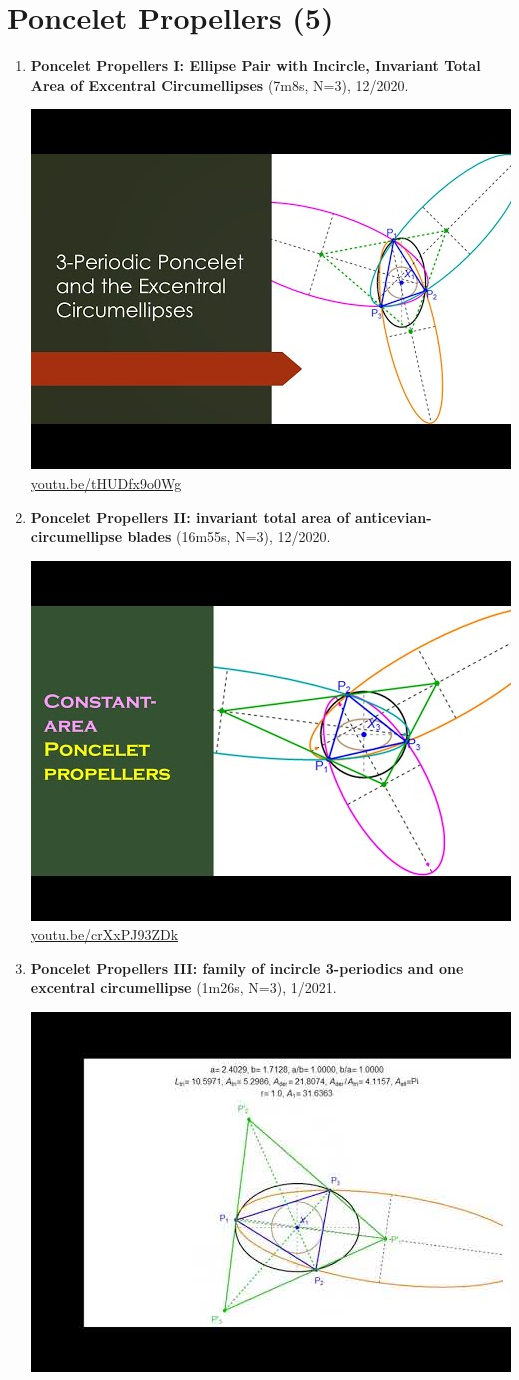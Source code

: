 \documentclass[12pt]{amsart}
\begin{document}
\section{Poncelet Propellers (5)}

\begin{enumerate}[resume]
\item \textbf{Poncelet Propellers I: Ellipse Pair with Incircle, Invariant Total Area of Excentral Circumellipses} (7m8s, N=3), 12/2020. 
\begin{center}\includegraphics[width=.5\textwidth]{pics/tHUDfx9o0Wg.jpg} \\ 
\href{https://youtu.be/tHUDfx9o0Wg}{\url{youtu.be/tHUDfx9o0Wg}}\end{center}
% 
\item \textbf{Poncelet Propellers II: invariant total area of anticevian-circumellipse blades} (16m55s, N=3), 12/2020. 
\begin{center}\includegraphics[width=.5\textwidth]{pics/crXxPJ93ZDk.jpg} \\ 
\href{https://youtu.be/crXxPJ93ZDk}{\url{youtu.be/crXxPJ93ZDk}}\end{center}
% 
\item \textbf{Poncelet Propellers III: family of incircle 3-periodics and one excentral circumellipse} (1m26s, N=3), 1/2021. 
\begin{center}\includegraphics[width=.5\textwidth]{pics/JUCmAMsfdkI.jpg} \\ 

\end{center}
\end{enumerate}
\end{document}
